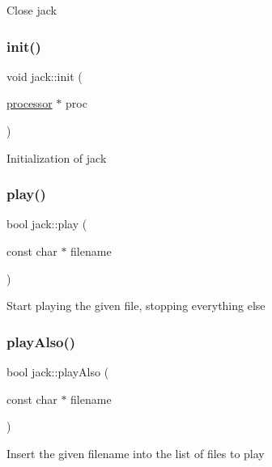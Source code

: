 Close jack \mbox{\label{classjack_adcd812fb47ff7c7081208fc7b5f65e89}} 
\subsubsection{\texorpdfstring{init()}{init()}}
{\footnotesize\ttfamily void jack\+::init (\begin{DoxyParamCaption}\item[{\hyperlink{classprocessor}{processor} $\ast$}]{proc }\end{DoxyParamCaption})\hspace{0.3cm}{\ttfamily [static]}}

Initialization of jack \mbox{\label{classjack_a4871a8263be867ba8ffbb5f81a19b547}} 
\subsubsection{\texorpdfstring{play()}{play()}}
{\footnotesize\ttfamily bool jack\+::play (\begin{DoxyParamCaption}\item[{const char $\ast$}]{filename }\end{DoxyParamCaption})\hspace{0.3cm}{\ttfamily [static]}}

Start playing the given file, stopping everything else \mbox{\label{classjack_a59ee9050b7aaa73ca252606818dc767d}} 
\subsubsection{\texorpdfstring{play\+Also()}{playAlso()}}
{\footnotesize\ttfamily bool jack\+::play\+Also (\begin{DoxyParamCaption}\item[{const char $\ast$}]{filename }\end{DoxyParamCaption})\hspace{0.3cm}{\ttfamily [static]}}

Insert the given filename into the list of files to play \mbox{\label{classjack_a2af30016c4bad33ebfc9ba7d2db4451a}} 
